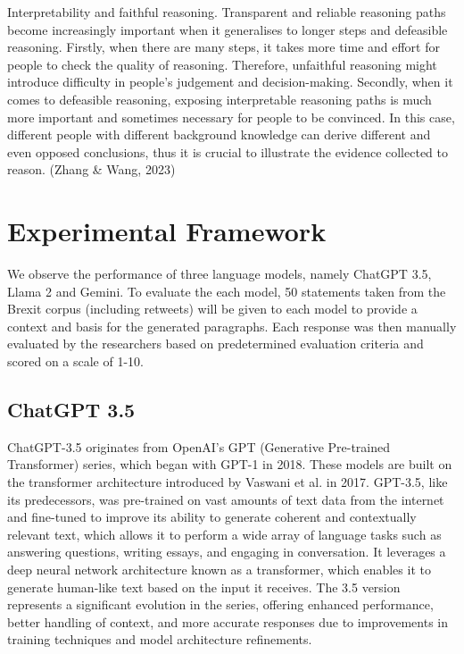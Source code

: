 \documentclass[fleqn,moreauthors,10pt]{ds_report}
\begin{document}
Interpretability and faithful reasoning. Transparent and reliable reasoning paths become increasingly important when it generalises to longer steps and defeasible reasoning. Firstly, when there are many steps, it takes more time and effort for people to check the quality of reasoning. Therefore, unfaithful reasoning might introduce difficulty in people’s judgement and decision-making. Secondly, when it comes to defeasible reasoning, exposing interpretable reasoning paths is much more important and sometimes necessary for people to be convinced. In this case, different people with different background knowledge can derive different and even opposed conclusions, thus it is crucial to illustrate the evidence collected to reason. (Zhang \& Wang, 2023)

\section*{Experimental Framework}

We observe the performance of three language models, namely ChatGPT 3.5, Llama 2 and Gemini. To evaluate the each model, 50 statements taken from the Brexit corpus (including retweets) will be given to each model to provide a context and basis for the generated paragraphs. Each response was then manually evaluated by the researchers based on predetermined evaluation criteria and scored on a scale of 1-10.

\subsection*{ChatGPT 3.5}
ChatGPT-3.5 originates from OpenAI's GPT (Generative Pre-trained Transformer) series, which began with GPT-1 in 2018. These models are built on the transformer architecture introduced by Vaswani et al. in 2017. GPT-3.5, like its predecessors, was pre-trained on vast amounts of text data from the internet and fine-tuned to improve its ability to generate coherent and contextually relevant text, which allows it to perform a wide array of language tasks such as answering questions, writing essays, and engaging in conversation. It leverages a deep neural network architecture known as a transformer, which enables it to generate human-like text based on the input it receives. The 3.5 version represents a significant evolution in the series, offering enhanced performance, better handling of context, and more accurate responses due to improvements in training techniques and model architecture refinements.
\end{document}
